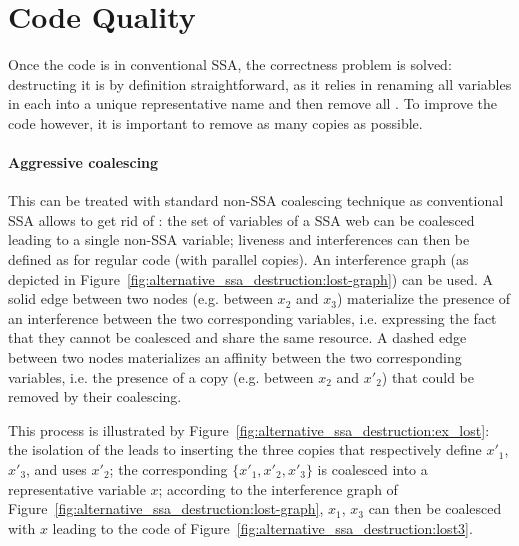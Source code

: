 \section{Code Quality}
Once the code is in conventional SSA, the correctness problem is solved: destructing it is by definition straightforward, as it relies in renaming all variables in each \phiweb into a unique representative name and then remove all \phifuns. To improve the code however, it
is important to remove as many copies as possible. 

\paragraph{Aggressive coalescing}
This can be treated
with standard non-SSA coalescing technique as conventional SSA allows to get rid of \phifuns: the set of variables of a SSA web can be coalesced leading to a single non-SSA variable; liveness and
interferences can then be defined as for regular code (with parallel copies). An interference graph (as depicted in Figure~\ref{fig:alternative_ssa_destruction:lost-graph}) can be used. A solid edge between two nodes (e.g. between $x_2$ and $x_3$) materialize the presence of an interference between the two corresponding variables, i.e. expressing the fact that they cannot be coalesced and share the same resource. A dashed edge between two nodes materializes an affinity between the two corresponding variables, i.e. the presence of a copy (e.g. between $x_2$ and $x'_2$) that could be removed by their coalescing.

This process is illustrated by Figure~\ref{fig:alternative_ssa_destruction:ex_lost}: the isolation of the \phifun leads to inserting the three copies that respectively define $x'_1$, $x'_3$, and uses $x'_2$; the corresponding \phiweb  $\{x'_1, x'_2, x'_3\}$ is coalesced into a representative variable $x$; according to the interference graph of Figure~\ref{fig:alternative_ssa_destruction:lost-graph}, $x_1$, $x_3$ can then be coalesced with $x$ leading to the code of Figure~\ref{fig:alternative_ssa_destruction:lost3}.

